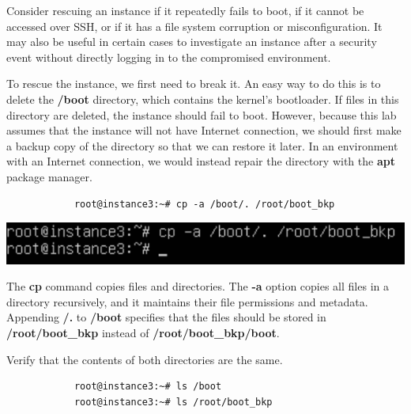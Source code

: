 \documentclass[letterpaper, 12pt]{article}
\begin{document}
\begin{enumerate}
    \begin{tipbox}
        Consider rescuing an instance if it repeatedly fails to boot, if it cannot be accessed over SSH, or if it has a file system corruption or misconfiguration.
        It may also be useful in certain cases to investigate an instance after a security event without directly logging in to the compromised environment.
    \end{tipbox}

    \begin{labstep}
        To rescue the instance, we first need to break it.
        An easy way to do this is to delete the \textbf{/boot} directory, which contains the kernel's bootloader.
        If files in this directory are deleted, the instance should fail to boot.
        However, because this lab assumes that the instance will not have Internet connection, we should first make a backup copy of the directory so that we can restore it later.
        In an environment with an Internet connection, we would instead repair the directory with the \textbf{apt} package manager.
        \begin{lstlisting}
            root@instance3:~# cp -a /boot/. /root/boot_bkp
        \end{lstlisting}

        \begin{center}
            \includegraphics[width=\linewidth]{images/part7/step7.png}
        \end{center}
    \end{labstep}

    \begin{notebox}
        The \textbf{cp} command copies files and directories.
        The \textbf{-a} option copies all files in a directory recursively, and it maintains their file permissions and metadata.
        Appending \textbf{/.} to \textbf{/boot} specifies that the files should be stored in \textbf{/root/boot\_bkp} instead of \textbf{/root/boot\_bkp/boot}.
    \end{notebox}

    \begin{labstep}
        Verify that the contents of both directories are the same.
        \begin{lstlisting}
            root@instance3:~# ls /boot
            root@instance3:~# ls /root/boot_bkp
        \end{lstlisting}


\end{labstep}
\end{enumerate}
\end{document}
